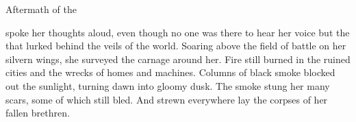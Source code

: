 
\begin{comment}
\chapter{The \Secondbanewar}
\end{comment}

%     
% 
% 
%    
%     

\begin{comment}
\section{\Nzessuacrith}
\end{comment}
\stamp
  {\dateSecherdamonsVow}
  {Aftermath of the \Secondbanewar}


{\CryocasNzessuacrith} spoke her thoughts aloud, even though no one was there to hear her voice but the  that lurked behind the veils of the world. 
Soaring above the field of battle on her silvern wings, she surveyed the carnage around her. 
% 
Fire still burned in the ruined cities and the wrecks of homes and machines. 
Columns of black smoke blocked out the sunlight, turning dawn into gloomy dusk. 
The smoke stung her many scars, some of which still bled. 
And strewn everywhere lay the corpses of her fallen  brethren. 

